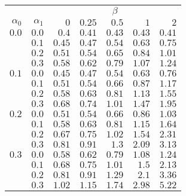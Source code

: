 \begin{tabular}{rr|rrrrr}
\hline\hline
 && \multicolumn{5}{c}{$\beta$}\\
 $\alpha_0$ & $\alpha_1$ & $0$ & $0.25$ & $0.5$ & $1$ & $2$ \\ 
 \hline
$0.0$ & $0.0$ & $0.4$ & $0.41$ & $0.43$ & $0.43$ & $0.41$\\ 
 & $0.1$ & $0.45$ & $0.47$ & $0.54$ & $0.63$ & $0.75$\\ 
 & $0.2$ & $0.51$ & $0.54$ & $0.65$ & $0.84$ & $1.01$\\ 
 & $0.3$ & $0.58$ & $0.62$ & $0.79$ & $1.07$ & $1.24$\\ 
\hline 
 $0.1$ & $0.0$ & $0.45$ & $0.47$ & $0.54$ & $0.63$ & $0.76$\\ 
 & $0.1$ & $0.51$ & $0.54$ & $0.66$ & $0.87$ & $1.17$\\ 
 & $0.2$ & $0.58$ & $0.63$ & $0.81$ & $1.13$ & $1.55$\\ 
 & $0.3$ & $0.68$ & $0.74$ & $1.01$ & $1.47$ & $1.95$\\ 
\hline 
 $0.2$ & $0.0$ & $0.51$ & $0.54$ & $0.66$ & $0.86$ & $1.03$\\ 
 & $0.1$ & $0.58$ & $0.63$ & $0.81$ & $1.15$ & $1.64$\\ 
 & $0.2$ & $0.67$ & $0.75$ & $1.02$ & $1.54$ & $2.31$\\ 
 & $0.3$ & $0.81$ & $0.91$ & $1.3$ & $2.09$ & $3.13$\\ 
\hline 
 $0.3$ & $0.0$ & $0.58$ & $0.62$ & $0.79$ & $1.08$ & $1.24$\\ 
 & $0.1$ & $0.68$ & $0.75$ & $1.01$ & $1.5$ & $2.13$\\ 
 & $0.2$ & $0.81$ & $0.91$ & $1.29$ & $2.1$ & $3.36$\\ 
 & $0.3$ & $1.02$ & $1.15$ & $1.74$ & $2.98$ & $5.22$\\ 
 \hline 
 \end{tabular}